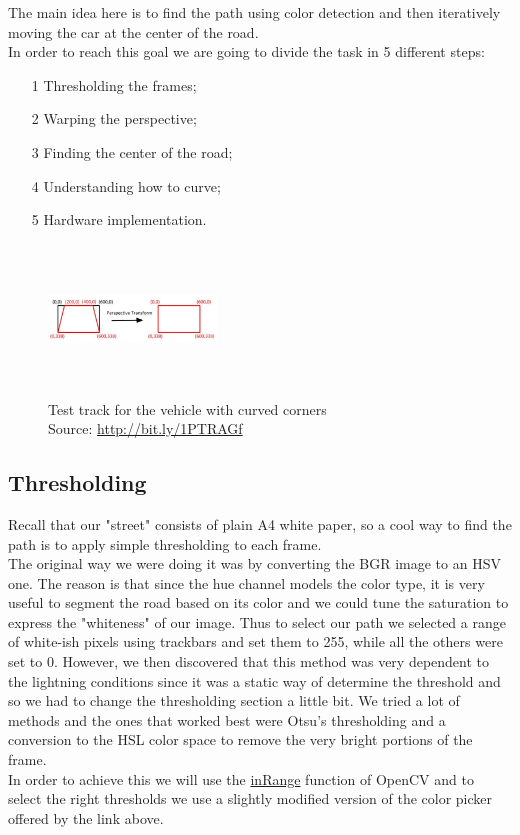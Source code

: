 \documentclass[12pt,a4paper]{article}
\begin{document}
\begin{large}
The main idea here is to find the path using color detection and then iteratively moving the car at the center of the road.\\
In order to reach this goal we are going to divide the task in 5 different steps:

\begin{itemize}
  \item[1] Thresholding the frames;
  \item[2] Warping the perspective;
  \item[3] Finding the center of the road;
  \item[4] Understanding how to curve;
  \item[5] Hardware implementation.
  \end{itemize}

\begin{figure}[hbp]
\centering
\includegraphics[width=0.4\textwidth, height = 4cm]{images/perspective_transform.jpg}
\caption{\label{fig:5}Test track for the vehicle with curved corners\\Source: \protect\url{http://bit.ly/1PTRAGf}}
\end{figure}

\subsection{Thresholding}
Recall that our "street" consists of plain A4 white paper, so a cool way to find the path is to apply simple thresholding to each frame.\\
The original way we were doing it was by converting the BGR image to an HSV one. The reason is that since the hue channel models the color type, it is very useful to segment the road based on its color and we could tune the saturation to express the "whiteness" of our image. Thus to select our path we selected a range of white-ish pixels using trackbars and set them to 255, while all the others were set to 0. However, we then discovered that this method was very dependent to the lightning conditions since it was a static way of determine the threshold and so we had to change the thresholding section a little bit. We tried a lot of methods and the ones that worked best were Otsu's thresholding and a conversion to the HSL color space to remove the very bright portions of the frame.\\
In order to achieve this we will use the \href{https://docs.opencv.org/3.4/da/d97/tutorial_threshold_inRange.html}{inRange} function of OpenCV and to select the right thresholds we use a slightly modified version of the color picker offered by the link above.


\end{large}
\end{document}
